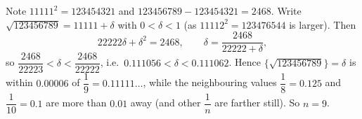 Note $11111^2=123454321$ and $123456789-123454321=2468$. Write $\sqrt{123456789}=11111+\delta$ with $0<\delta<1$ (as $11112^2=123476544$ is larger). Then
\[
22222\delta+\delta^2=2468,\qquad\delta=\dfrac{2468}{22222+\delta},
\]
so $\dfrac{2468}{22223}<\delta<\dfrac{2468}{22222}$, i.e.\ $0.111056<\delta<0.111062$. Hence $\{\sqrt{123456789}\}=\delta$ is within $0.00006$ of $\dfrac{1}{9}=0.11111\ldots$, while the neighbouring values $\dfrac{1}{8}=0.125$ and $\dfrac{1}{10}=0.1$ are more than $0.01$ away (and other $\dfrac{1}{n}$ are farther still). So $n=\boxed{9}$.
